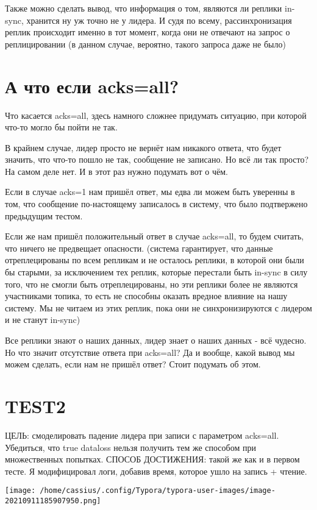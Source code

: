 \documentclass[11pt]{article}
\begin{document}
    Также можно сделать вывод, что информация о том, являются ли реплики in-sync, хранится ну уж точно не у лидера. И судя по всему, рассинхронизация реплик происходит именно в тот момент, когда они не отвечают на запрос о реплицировании (в данном случае, вероятно, такого запроса даже не было)
    
    \section{А что если acks=all?}
    Что касается acks=all, здесь намного сложнее придумать ситуацию, при которой что-то могло бы пойти не так.

    В крайнем случае, лидер просто не вернёт нам никакого ответа, что будет значить, что что-то пошло не так, сообщение не записано. Но всё ли так просто? На самом деле нет. И в этот раз нужно подумать вот о чём.

    Если в случае acks=1 нам пришёл ответ, мы едва ли можем быть уверенны в  том, что сообщение по-настоящему записалось в систему, что было подтвержено предыдущим тестом.

    Если же нам пришёл положительный ответ в случае acks=all, то будем считать, что ничего не предвещает опасности. (система гарантирует, что данные отреплецированы по всем репликам и не осталось реплики, в которой они были бы старыми, за исключением тех реплик, которые перестали быть in-sync в силу того, что не смогли быть отреплецированы, но эти реплики более не являются участниками топика, то есть не способны оказать вредное влияние на нашу систему. Мы не читаем из этих реплик, пока они не синхронизируются с лидером и не станут in-sync)

    Все реплики знают о наших данных, лидер знает о наших данных - всё чудесно. Но что значит отсутствие ответа при acks=all? Да и вообще, какой вывод мы можем сделать, если нам не пришёл ответ? Стоит подумать об этом.

    \section{TEST2}
    ЦЕЛЬ: смоделировать падение лидера при записи с параметром acks=all. Убедиться, что true dataloss нельзя получить тем же способом при множественных попытках.
    СПОСОБ ДОСТИЖЕНИЯ: такой же как и в первом тесте.
    Я модифицировал логи, добавив время, которое ушло на запись + чтение.

    \texttt{[image: /home/cassius/.config/Typora/typora-user-images/image-20210911185907950.png]}
\end{document}
